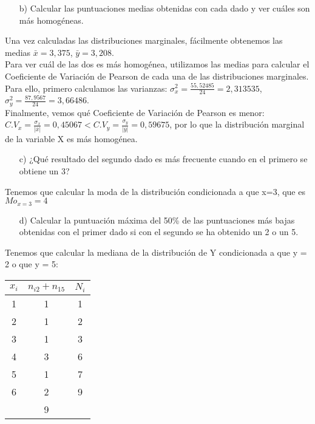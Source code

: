 \documentclass[a4paper,12pt]{article}
\begin{document}
\begin{enumerate}
    \item[b)] Calcular las puntuaciones medias obtenidas con cada dado y ver cuáles son más homogéneas.
\end{enumerate}

Una vez calculadas las distribuciones marginales, fácilmente obtenemos las medias $\bar x=3,375$, $\bar y = 3,208$.\\
Para ver cuál de las dos es más homogénea, utilizamos las medias para calcular el Coeficiente de Variación de Pearson de cada una de las distribuciones marginales. Para ello, primero calculamos las varianzas:
$\sigma_x^2=\frac{55,52485}{24}=2,313535$, $\sigma_y^2=\frac{87,9567}{24}=3,66486$.\\
Finalmente, vemos qué Coeficiente de Variación de Pearson es menor: $C.V_x=\frac{\sigma_x}{|\bar x|}= 0,45067 < C.V_y=\frac{\sigma_y}{|\bar y|}=0,59675$, por lo que la distribución marginal de la variable X es más homogénea.\\

\begin{enumerate}
    \item[c)] ¿Qué resultado del segundo dado es más frecuente cuando en el primero se obtiene un 3?
\end{enumerate}

Tenemos que calcular la moda de la distribución condicionada a que x=3, que es $Mo_{x=3}=4$\\


\begin{enumerate}
    \item[d)] Calcular la puntuación máxima del 50\% de las puntuaciones más bajas obtenidas con el primer dado si con el segundo se ha obtenido un 2 o un 5.
\end{enumerate}

Tenemos que calcular la mediana de la distribución de Y condicionada a que y = 2 o que y = 5:

\begin{center}
\begin{tabular}{c|c|c}
$x_i$ & $n_{i2}+n_{15}$&$N_i$ \\
\hline
1 & 1 & 1 \\
2 & 1 & 2 \\
3 & 1 & 3 \\
4 & 3 & 6 \\
5 & 1 & 7 \\
6 & 2 & 9 \\
\hline
&9&\\
\end{tabular}
\end{center}
\end{document}

